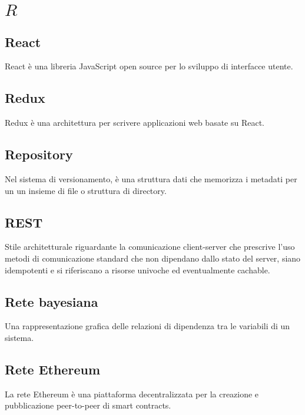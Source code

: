 \section{\quad$R\quad$}
\subsection{React}
React è una libreria JavaScript open source per lo sviluppo di interfacce utente.

\subsection{Redux}
Redux è una architettura per scrivere applicazioni web basate su React.

\subsection{Repository}
Nel sistema di versionamento, è una struttura dati che memorizza i metadati per un un insieme di file o struttura di directory. 

\subsection{REST}
Stile architetturale riguardante la comunicazione client-server che prescrive l’uso metodi di comunicazione standard che non dipendano dallo stato del server, siano idempotenti e si riferiscano a risorse univoche ed eventualmente cachable.

\subsection{Rete bayesiana}
Una rappresentazione grafica delle relazioni di dipendenza tra le variabili di un sistema.

\subsection{Rete Ethereum}
La rete Ethereum è una piattaforma decentralizzata per la creazione e pubblicazione peer-to-peer di smart contracts.

